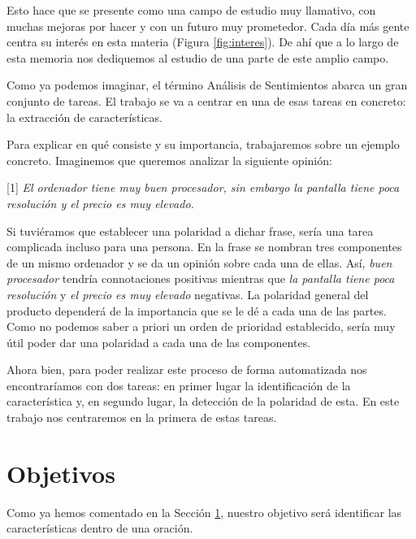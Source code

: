 	 Esto hace que se presente como una campo de estudio muy llamativo, con muchas mejoras por hacer y con un futuro muy prometedor. Cada día más gente centra su interés en esta materia (Figura \ref{fig:interes}). De ahí que a lo largo de esta memoria nos dediquemos al estudio de una parte de este amplio campo.
	 

	Como ya podemos imaginar, el término Análisis de Sentimientos abarca un gran conjunto de tareas. El trabajo se va a centrar en una de esas tareas en concreto: la extracción de características. 

	Para explicar en qué consiste y su importancia, trabajaremos sobre un ejemplo concreto. Imaginemos que queremos analizar la siguiente opinión:
	
	\begin{center}
		\begin{minipage}{0.9\linewidth}
			\vspace{5pt}%
			{\small
				[1] \textit{El ordenador tiene muy buen procesador, sin embargo la pantalla tiene poca resolución y el precio es muy elevado.}
			}
			\vspace{5pt}%
		\end{minipage}
	\end{center}

	Si tuviéramos que establecer una polaridad a dichar frase, sería una tarea complicada incluso para una persona. En la frase se nombran tres componentes de un mismo ordenador y se da un opinión sobre cada una de ellas. Así, \textit{buen procesador} tendría connotaciones positivas mientras que \textit{la pantalla tiene poca resolución} y \textit{el precio es muy elevado} negativas. La polaridad general del producto dependerá de la importancia que se le dé a cada una de las partes. Como no podemos saber a priori un orden de prioridad establecido, sería muy útil poder dar una polaridad a cada una de las componentes.
	
	Ahora bien, para poder realizar este proceso de forma automatizada nos encontraríamos con dos tareas: en primer lugar la identificación de la característica y, en segundo lugar, la detección de la polaridad de esta. En este trabajo nos centraremos en la primera de estas tareas. 

	\section{Objetivos} \label{objetivos}
	
	Como ya hemos comentado en la Sección \ref{objetivos}, nuestro objetivo será identificar las características dentro de una oración. 
	
		

	
